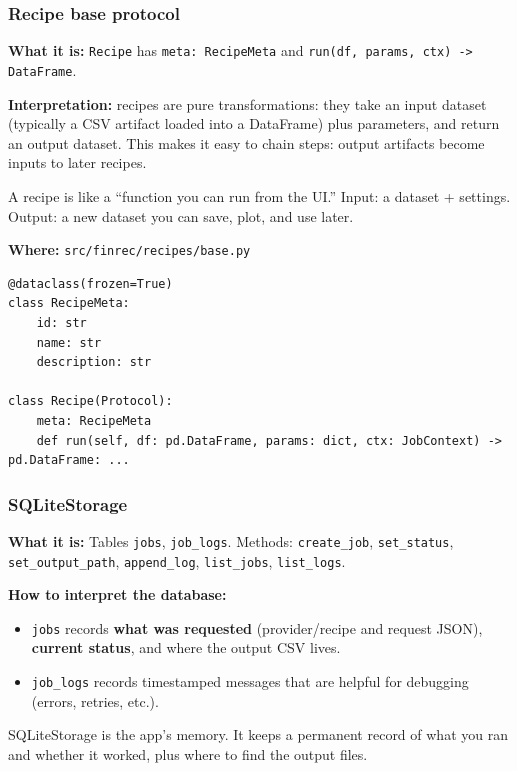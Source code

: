 \documentclass[11pt,a4paper]{article}
\begin{document}
\subsubsection{Recipe base protocol}\label{sec:recipe-base}

\textbf{What it is:} \texttt{Recipe} has \texttt{meta: RecipeMeta} and \texttt{run(df, params, ctx) -> DataFrame}.

\textbf{Interpretation:} recipes are pure transformations: they take an input dataset (typically a CSV artifact loaded into a DataFrame) plus parameters, and return an output dataset. This makes it easy to chain steps: output artifacts become inputs to later recipes.

\begin{intuitionbox}
A recipe is like a ``function you can run from the UI.'' Input: a dataset + settings. Output: a new dataset you can save, plot, and use later.
\end{intuitionbox}

\textbf{Where:} \texttt{src/finrec/recipes/base.py}

\begin{lstlisting}
@dataclass(frozen=True)
class RecipeMeta:
    id: str
    name: str
    description: str

class Recipe(Protocol):
    meta: RecipeMeta
    def run(self, df: pd.DataFrame, params: dict, ctx: JobContext) -> pd.DataFrame: ...
\end{lstlisting}

\subsubsection{SQLiteStorage}\label{sec:sqlite}

\textbf{What it is:} Tables \texttt{jobs}, \texttt{job\_logs}. Methods: \texttt{create\_job}, \texttt{set\_status}, \texttt{set\_output\_path}, \texttt{append\_log}, \texttt{list\_jobs}, \texttt{list\_logs}.

\textbf{How to interpret the database:}
\begin{itemize}[leftmargin=2em]
  \item \texttt{jobs} records \textbf{what was requested} (provider/recipe and request JSON), \textbf{current status}, and where the output CSV lives.
  \item \texttt{job\_logs} records timestamped messages that are helpful for debugging (errors, retries, etc.).
\end{itemize}

\begin{intuitionbox}
SQLiteStorage is the app’s memory. It keeps a permanent record of what you ran and whether it worked, plus where to find the output files.
\end{intuitionbox}
\end{document}
